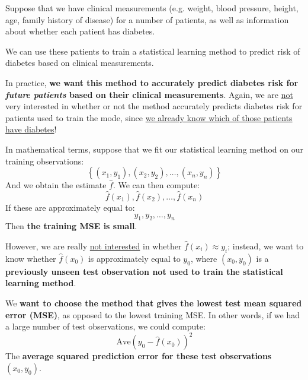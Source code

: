 \documentclass[a4paper]{article}
\newcommand{\definition}[1]{\textcolor{Red3}{\textbf{#1}}\index{#1}}
\newcommand{\highspace}{\vspace{1.2em}\noindent}
\begin{document}
    \begin{examplebox}
        Suppose that we have clinical measurements (e.g. weight, blood pressure, height, age, family history of disease) for a number of patients, as well as information about whether each patient has diabetes.

        \highspace
        We can use these patients to train a statistical learning method to predict risk of diabetes based on clinical measurements.

        \highspace
        In practice, \textbf{we want this method to accurately predict diabetes risk for \emph{future patients} based on their clinical measurements}. Again, we are \underline{not} very interested in whether or not the method accurately predicts diabetes risk for patients used to train the mode, since \underline{we already know which of those patients have diabetes}!
    \end{examplebox}

    \noindent
    In mathematical terms, suppose that we fit our statistical learning method on our training observations:
    \begin{equation*}
        \left\{\left(x_{1}, y_{1}\right), \left(x_{2}, y_{2}\right), \dots, \left(x_{n}, y_{n}\right)\right\}
    \end{equation*}
    And we obtain the estimate $\hat{f}$. We can then compute:
    \begin{equation*}
        \hat{f}\left(x_{1}\right), \hat{f}\left(x_{2}\right), \dots, \hat{f}\left(x_{n}\right)
    \end{equation*}
    If these are approximately equal to:
    \begin{equation*}
        y_{1}, y_{2}, \dots, y_{n}
    \end{equation*}
    Then \textbf{the training MSE is small}.

    \highspace
    However, we are really \underline{not interested} in whether $\hat{f}\left(x_{i}\right) \approx y_{i}$; instead, we want to know whether $\hat{f}\left(x_{0}\right)$ is approximately equal to $y_{0}$, where $\left(x_{0}, y_{0}\right)$ is a \textbf{previously unseen test observation not used to train the statistical learning method}.

    We \textbf{want to choose the method that gives the lowest} \definition{test mean squared error (MSE)}, as opposed to the lowest training MSE. In other words, if we had a large number of test observations, we could compute:
    \begin{equation}
        \mathrm{Ave}\left(y_{0} - \hat{f}\left(x_{0}\right)\right)^{2}
    \end{equation}
    The \textbf{average squared prediction error for these test observations} $\left(x_{0}, y_{0}\right)$.
\end{document}
